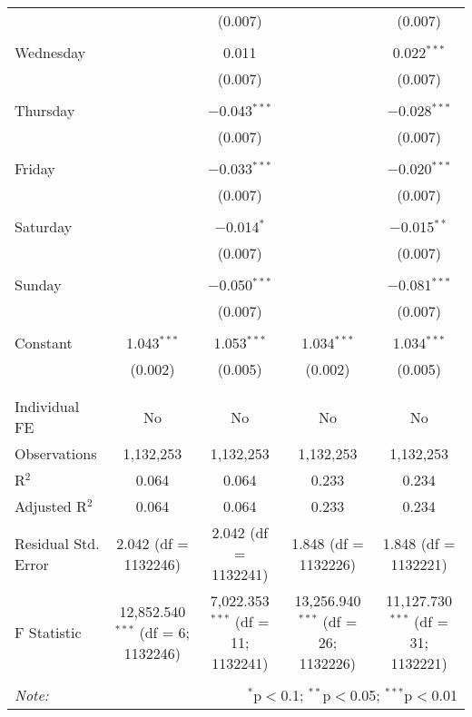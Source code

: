 \documentclass[
]{article}
\begin{document}
\begin{table}[!htbp]
{\begin{tabular}{@{\extracolsep{5pt}}lcccc}
  &  & (0.007) &  & (0.007) \\ 
  & & & & \\ 
 Wednesday &  & 0.011 &  & 0.022$^{***}$ \\ 
  &  & (0.007) &  & (0.007) \\ 
  & & & & \\ 
 Thursday &  & $-$0.043$^{***}$ &  & $-$0.028$^{***}$ \\ 
  &  & (0.007) &  & (0.007) \\ 
  & & & & \\ 
 Friday &  & $-$0.033$^{***}$ &  & $-$0.020$^{***}$ \\ 
  &  & (0.007) &  & (0.007) \\ 
  & & & & \\ 
 Saturday &  & $-$0.014$^{*}$ &  & $-$0.015$^{**}$ \\ 
  &  & (0.007) &  & (0.007) \\ 
  & & & & \\ 
 Sunday &  & $-$0.050$^{***}$ &  & $-$0.081$^{***}$ \\ 
  &  & (0.007) &  & (0.007) \\ 
  & & & & \\ 
 Constant & 1.043$^{***}$ & 1.053$^{***}$ & 1.034$^{***}$ & 1.034$^{***}$ \\ 
  & (0.002) & (0.005) & (0.002) & (0.005) \\ 
  & & & & \\ 
\hline \\[-1.8ex] 
Individual FE & No & No & No & No \\ 
Observations & 1,132,253 & 1,132,253 & 1,132,253 & 1,132,253 \\ 
R$^{2}$ & 0.064 & 0.064 & 0.233 & 0.234 \\ 
Adjusted R$^{2}$ & 0.064 & 0.064 & 0.233 & 0.234 \\ 
Residual Std. Error & 2.042 (df = 1132246) & 2.042 (df = 1132241) & 1.848 (df = 1132226) & 1.848 (df = 1132221) \\ 
F Statistic & 12,852.540$^{***}$ (df = 6; 1132246) & 7,022.353$^{***}$ (df = 11; 1132241) & 13,256.940$^{***}$ (df = 26; 1132226) & 11,127.730$^{***}$ (df = 31; 1132221) \\ 
\hline 
\hline \\[-1.8ex] 
\textit{Note:}  & \multicolumn{4}{r}{$^{*}$p$<$0.1; $^{**}$p$<$0.05; $^{***}$p$<$0.01} \\ 
\end{tabular}
} 
\end{table} 
\newpage
\end{document}
